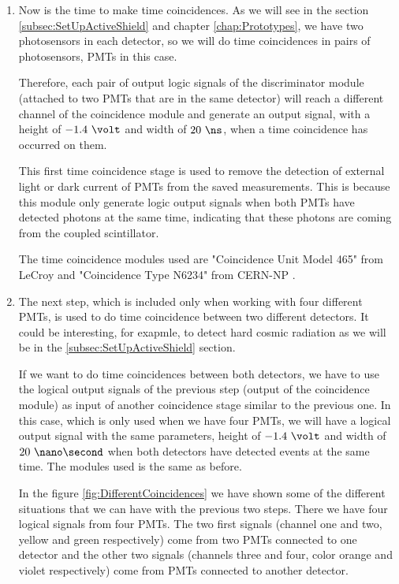 \begin{itemize}
\begin{enumerate}
\item{} Now is the time to make time coincidences. As we will see in the section \ref{subsec:SetUpActiveShield} and chapter \ref{chap:Prototypes}, we have two photosensors in each detector, so we will do time coincidences in pairs of photosensors, PMTs in this case.

Therefore, each pair of output logic signals of the discriminator module (attached to two PMTs that are in the same detector) will reach a different channel of the coincidence module and generate an output signal, with a height of $-1.4~\volt$ and width of $20~\ns$, when a time coincidence has occurred on them.

This first time coincidence stage is used to remove the detection of  external light or dark current of PMTs from the saved measurements. This is because this module only generate logic output signals when both PMTs have detected photons at the same time, indicating that these photons are coming from the coupled scintillator.

The time coincidence modules used are "Coincidence Unit Model 465" from LeCroy \cite{DataSheetCoincidenceLeCroy} and "Coincidence Type N6234" from CERN-NP \cite{DataSheetCoincidenceCERN}.

\item{} The next step, which is included only when working with four different PMTs, is used to do time coincidence between two different detectors. It could be interesting, for exapmle, to detect hard cosmic radiation as we will be in the \ref{subsec:SetUpActiveShield} section.

If we want to do time coincidences between both detectors, we have to use the logical output signals of the previous step (output of the coincidence module) as input of another coincidence stage similar to the previous one. In this case, which is only used when we have four PMTs, we will have a logical output signal with the same parameters, height of $-1.4~\volt$ and width of $20~\nano\second$ when both detectors have detected events at the same time. The modules used is the same as before.

In the figure \ref{fig:DifferentCoincidences} we have shown some of the different situations that we can have with the previous two steps. There we have four logical signals from four PMTs. The two first signals (channel one and two, yellow and green respectively) come from two PMTs connected to one detector and the other two signals (channels three and four, color orange and violet respectively) come from PMTs connected to another detector.


\end{enumerate}
\end{itemize}
